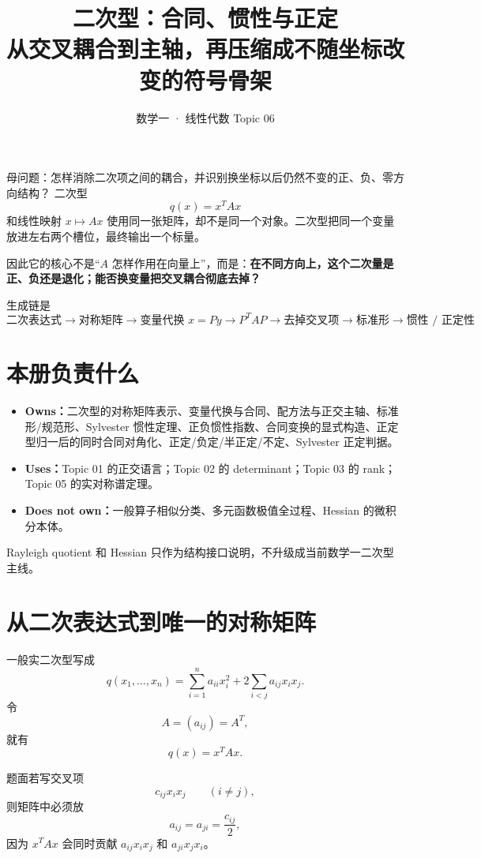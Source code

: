 \documentclass[11pt,a4paper]{ctexart}
\title{\vspace{-1.1cm}\textbf{二次型：合同、惯性与正定}\\[0.4em]
\large 从交叉耦合到主轴，再压缩成不随坐标改变的符号骨架}
\author{数学一 · 线性代数 Topic 06}
\date{}
\newcommand{\kw}[1]{\textbf{\color{deep}#1}}
\begin{document}
\maketitle

\begin{corebox}{母问题：怎样消除二次项之间的耦合，并识别换坐标以后仍然不变的正、负、零方向结构？}
二次型
\[
q(x)=x^TAx
\]
和线性映射 $x\mapsto Ax$ 使用同一张矩阵，却不是同一个对象。二次型把同一个变量放进左右两个槽位，最终输出一个标量。

因此它的核心不是“$A$ 怎样作用在向量上”，而是：\kw{在不同方向上，这个二次量是正、负还是退化；能否换变量把交叉耦合彻底去掉？}

生成链是
\[
\boxed{
\text{二次表达式}
\to \text{对称矩阵}
\to \text{变量代换 }x=Py
\to P^TAP
\to \text{去掉交叉项}
\to \text{标准形}
\to \text{惯性 / 正定性}
}
\]
\end{corebox}

\section{本册负责什么}

\begin{itemize}
  \item \kw{Owns：}二次型的对称矩阵表示、变量代换与合同、配方法与正交主轴、标准形/规范形、Sylvester 惯性定理、正负惯性指数、合同变换的显式构造、正定型归一后的同时合同对角化、正定/负定/半正定/不定、Sylvester 正定判据。
  \item \kw{Uses：}Topic 01 的正交语言；Topic 02 的 determinant；Topic 03 的 rank；Topic 05 的实对称谱定理。
  \item \kw{Does not own：}一般算子相似分类、多元函数极值全过程、Hessian 的微积分本体。
\end{itemize}

Rayleigh quotient 和 Hessian 只作为结构接口说明，不升级成当前数学一二次型主线。

\section{从二次表达式到唯一的对称矩阵}

一般实二次型写成
\[
q(x_1,\dots,x_n)
=\sum_{i=1}^{n}a_{ii}x_i^2
+2\sum_{i<j}a_{ij}x_ix_j.
\]
令
\[
A=(a_{ij})=A^T,
\]
就有
\[
\boxed{q(x)=x^TAx.}
\]

题面若写交叉项
\[
c_{ij}x_ix_j\qquad(i\neq j),
\]
则矩阵中必须放
\[
\boxed{a_{ij}=a_{ji}=\frac{c_{ij}}2,}
\]
因为 $x^TAx$ 会同时贡献 $a_{ij}x_ix_j$ 和 $a_{ji}x_jx_i$。
\end{document}

